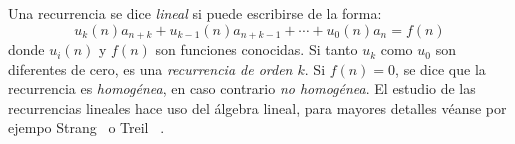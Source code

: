   Una recurrencia se dice \emph{lineal} si puede escribirse de la forma:
  \begin{equation}
    \label{eq:recurrence-linear}
    u_k(n) a_{n + k}
	+ u_{k - 1} (n) a_{n + k - 1}
	+ \dotsb
	+ u_0(n) a_n
      = f(n)
  \end{equation}
  donde \(u_i(n)\) y \(f(n)\) son funciones conocidas.
  Si tanto \(u_k\) como \(u_0\) son diferentes de cero,
  es una \emph{recurrencia de orden \(k\)}.
  Si \(f(n) = 0\),
  se dice que la recurrencia es \emph{homogénea},
  en caso contrario \emph{no homogénea}.
  El estudio de las recurrencias lineales
  hace uso del álgebra lineal,
  para mayores detalles véanse por ejempo Strang~%
    \cite{strang09:_intr_linear_algebra}
  o Treil~%
    \cite{treil14:_linear_algeb_done_wrong}.

